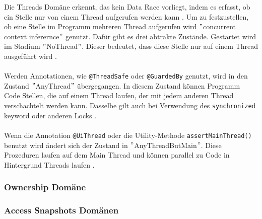 Die Threads Domäne erkennt, das kein Data Race vorliegt, indem es erfasst, ob ein Stelle nur von einem Thread aufgerufen werden kann \cite[vgl.][8]{racerd}. Um zu festzustellen, ob eine Stelle im Programm mehreren Thread aufgerufen wird $"$concurrent context inferernce$"$ \cite[9]{racerd} genutzt. Dafür gibt es drei abtrakte Zustände.
Gestartet wird im Stadium $"$NoThread$"$. Dieser bedeutet, dass diese Stelle nur auf einem Thread ausgeführt wird \cite[vgl.][9-10]{racerd}.\\
\\
Werden Annotationen, wie \texttt{@ThreadSafe} oder \texttt{@GuardedBy} genutzt, wird in den Zustand $"$AnyThread$"$ übergegangen. In diesem Zustand können Programm Code Stellen, die auf einem Thread laufen, der mit jedem anderen Thread verschachtelt werden kann. Dasselbe gilt auch bei Verwendung des \texttt{synchronized} keyword oder anderen Locks \cite[vgl.][10]{racerd}.\\
\\
Wenn die Annotation \texttt{@UiThread} oder die Utility-Methode \texttt{assertMainThread()} benutzt wird ändert sich der Zustand in $"$AnyThreadButMain$"$. Diese Prozeduren laufen auf dem Main Thread und können parallel zu Code in Hintergrund Threads laufen \cite[vgl.][10]{racerd}.

\subsubsection*{Ownership Domäne}

\subsubsection*{Access Snapshots Domänen}